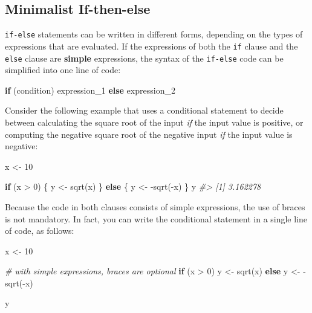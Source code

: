 \documentclass[
]{book}
\newenvironment{Shaded}{\begin{snugshade}}{\end{snugshade}}
\newcommand{\CommentTok}[1]{\textcolor[rgb]{0.56,0.35,0.01}{\textit{#1}}}
\newcommand{\ControlFlowTok}[1]{\textcolor[rgb]{0.13,0.29,0.53}{\textbf{#1}}}
\newcommand{\DecValTok}[1]{\textcolor[rgb]{0.00,0.00,0.81}{#1}}
\newcommand{\FunctionTok}[1]{\textcolor[rgb]{0.00,0.00,0.00}{#1}}
\newcommand{\NormalTok}[1]{#1}
\newcommand{\OtherTok}[1]{\textcolor[rgb]{0.56,0.35,0.01}{#1}}
\newcommand{\SpecialCharTok}[1]{\textcolor[rgb]{0.00,0.00,0.00}{#1}}
\begin{document}
\hypertarget{minimalist-if-then-else}{%
\subsection{Minimalist If-then-else}\label{minimalist-if-then-else}}

\texttt{if-else} statements can be written in different forms, depending on the types
of expressions that are evaluated. If the expressions of both the \texttt{if} clause
and the \texttt{else} clause are \textbf{simple} expressions, the syntax of the \texttt{if-else}
code can be simplified into one line of code:

\begin{Shaded}
\begin{Highlighting}[]
\ControlFlowTok{if}\NormalTok{ (condition) expression\_1 }\ControlFlowTok{else}\NormalTok{ expression\_2}
\end{Highlighting}
\end{Shaded}

Consider the following example that uses a conditional statement to decide
between calculating the square root of the input \emph{if} the input value is
positive, or computing the negative square root of the negative input \emph{if} the
input value is negative:

\begin{Shaded}
\begin{Highlighting}[]
\NormalTok{x }\OtherTok{\textless{}{-}} \DecValTok{10}

\ControlFlowTok{if}\NormalTok{ (x }\SpecialCharTok{\textgreater{}} \DecValTok{0}\NormalTok{) \{}
\NormalTok{  y }\OtherTok{\textless{}{-}} \FunctionTok{sqrt}\NormalTok{(x) }
\NormalTok{\} }\ControlFlowTok{else}\NormalTok{ \{}
\NormalTok{  y }\OtherTok{\textless{}{-}} \SpecialCharTok{{-}}\FunctionTok{sqrt}\NormalTok{(}\SpecialCharTok{{-}}\NormalTok{x)}
\NormalTok{\}}
\NormalTok{y}
\CommentTok{\#\textgreater{} [1] 3.162278}
\end{Highlighting}
\end{Shaded}

Because the code in both clauses consists of simple expressions, the use of
braces is not mandatory. In fact, you can write the conditional statement in
a single line of code, as follows:

\begin{Shaded}
\begin{Highlighting}[]
\NormalTok{x }\OtherTok{\textless{}{-}} \DecValTok{10}

\CommentTok{\# with simple expressions, braces are optional}
\ControlFlowTok{if}\NormalTok{ (x }\SpecialCharTok{\textgreater{}} \DecValTok{0}\NormalTok{) y }\OtherTok{\textless{}{-}} \FunctionTok{sqrt}\NormalTok{(x) }\ControlFlowTok{else}\NormalTok{ y }\OtherTok{\textless{}{-}} \SpecialCharTok{{-}}\FunctionTok{sqrt}\NormalTok{(}\SpecialCharTok{{-}}\NormalTok{x)}

\NormalTok{y}
\end{Highlighting}
\end{Shaded}
\end{document}
